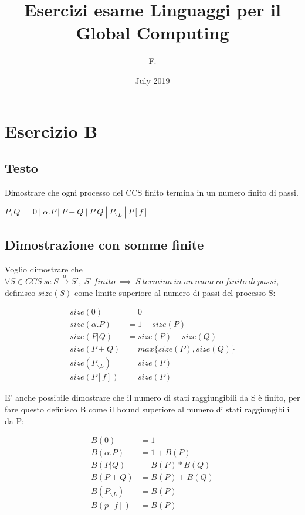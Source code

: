 \documentclass{article}
\title{Esercizi esame Linguaggi per il Global Computing}
\author{F.}
\date{July 2019}
\newcommand{\pl}{P_{\backslash L}}
\begin{document}
\maketitle

\section{Esercizio B}
\subsection{Testo}

Dimostrare che ogni processo del CCS finito termina in un numero finito di passi.
\begin{center}
    $P, Q = ~0 ~|~ \alpha .P~|~ P+Q~|~ P|Q ~ | ~P_{\backslash L}~|~P[f] $
\end{center}

\subsection{Dimostrazione con somme finite}
Voglio dimostrare che  $\forall S \in CCS~  se ~ S \xrightarrow{\alpha}  S', ~S'~  finito ~ \implies  ~ S ~ termina~  in~  un~  numero~  finito ~ di~  passi$, definisco $size(S)$ come limite superiore al numero di passi del processo S:

\begin{align*}
size(0) &= 0 \\
size(\alpha.P) &= 1+size(P)\\
size(P|Q) &= size(P)+size(Q)\\
size(P+Q) &= max\{size(P), size(Q)\}\\
size(P_{\backslash L}) &= size(P)\\
size(P[f]) &= size(P)
\end{align*}

E' anche possibile dimostrare che il numero di stati raggiungibili da S è finito, per fare questo definisco B come il bound superiore al numero di stati raggiungibili da P:

\begin{align*}
B(0) &= 1\\
B(\alpha.P) &= 1 + B(P)\\
B(P|Q) &= B(P) * B(Q)\\
B(P+Q) &= B(P) + B(Q)\\
B(\pl) &=  B(P)\\
B(p[f]) &=  B(P)
\end{align*}
\end{document}
